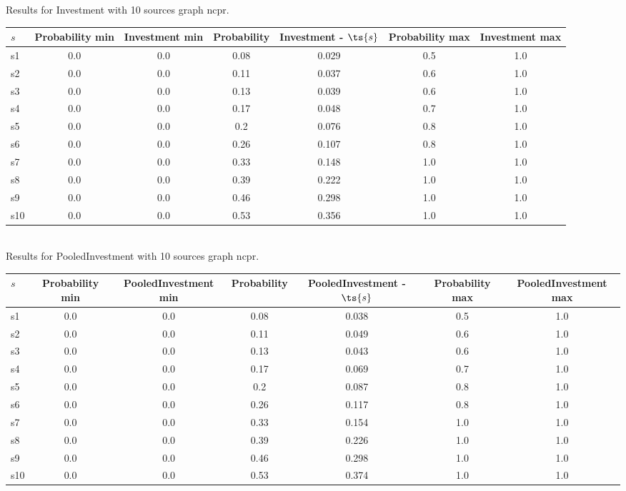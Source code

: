 \documentclass{article}
\begin{document}
\noindent Results for Investment with 10 sources graph ncpr.

\noindent\begin{tabular}{|l|c|c|c|c|c|c|}
\hline
$s$& Probability min & Investment min & Probability & Investment - $\ts{s}$ & Probability max & Investment max\\
\hline
s1 &0.0 & 0.0 & 0.08 & 0.029 & 0.5 & 1.0\\
\hline
s2 &0.0 & 0.0 & 0.11 & 0.037 & 0.6 & 1.0\\
\hline
s3 &0.0 & 0.0 & 0.13 & 0.039 & 0.6 & 1.0\\
\hline
s4 &0.0 & 0.0 & 0.17 & 0.048 & 0.7 & 1.0\\
\hline
s5 &0.0 & 0.0 & 0.2 & 0.076 & 0.8 & 1.0\\
\hline
s6 &0.0 & 0.0 & 0.26 & 0.107 & 0.8 & 1.0\\
\hline
s7 &0.0 & 0.0 & 0.33 & 0.148 & 1.0 & 1.0\\
\hline
s8 &0.0 & 0.0 & 0.39 & 0.222 & 1.0 & 1.0\\
\hline
s9 &0.0 & 0.0 & 0.46 & 0.298 & 1.0 & 1.0\\
\hline
s10 &0.0 & 0.0 & 0.53 & 0.356 & 1.0 & 1.0\\
\hline
\end{tabular}\\

\noindent Results for PooledInvestment with 10 sources graph ncpr.

\noindent\begin{tabular}{|l|c|c|c|c|c|c|}
\hline
$s$& Probability min & PooledInvestment min & Probability & PooledInvestment - $\ts{s}$ & Probability max & PooledInvestment max\\
\hline
s1 &0.0 & 0.0 & 0.08 & 0.038 & 0.5 & 1.0\\
\hline
s2 &0.0 & 0.0 & 0.11 & 0.049 & 0.6 & 1.0\\
\hline
s3 &0.0 & 0.0 & 0.13 & 0.043 & 0.6 & 1.0\\
\hline
s4 &0.0 & 0.0 & 0.17 & 0.069 & 0.7 & 1.0\\
\hline
s5 &0.0 & 0.0 & 0.2 & 0.087 & 0.8 & 1.0\\
\hline
s6 &0.0 & 0.0 & 0.26 & 0.117 & 0.8 & 1.0\\
\hline
s7 &0.0 & 0.0 & 0.33 & 0.154 & 1.0 & 1.0\\
\hline
s8 &0.0 & 0.0 & 0.39 & 0.226 & 1.0 & 1.0\\
\hline
s9 &0.0 & 0.0 & 0.46 & 0.298 & 1.0 & 1.0\\
\hline
s10 &0.0 & 0.0 & 0.53 & 0.374 & 1.0 & 1.0\\
\hline
\end{tabular}\\
\end{document}
